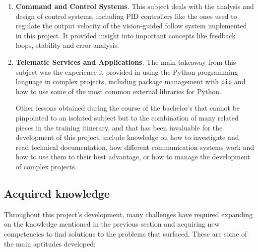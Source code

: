 \begin{enumerate}
    \item \textbf{Command and Control Systems}. This subject deals with the analysis and design of control systems, including PID controllers like the ones used to regulate the output velocity of the vision-guided follow system implemented in this project. It provided insight into important concepts like feedback loops, stability and error analysis.
    
    \item \textbf{Telematic Services and Applications}. The main takeaway from this subject was the experience it provided in using the Python programming language in complex projects, including package management with \texttt{pip} and how to use some of the most common external libraries for Python.
    
    Other lessons obtained during the course of the bachelor's that cannot be pinpointed to an isolated subject but to the combination of many related pieces in the training itinerary, and that has been invaluable for the development of this project, include knowledge on how to investigate and read technical documentation, how different communication systems work and how to use them to their best advantage, or how to manage the development of complex projects.
\end{enumerate}


\subsection{Acquired knowledge}

Throughout this project's development, many challenges have required expanding on the knowledge mentioned in the previous section and acquiring new competencies to find solutions to the problems that surfaced.
These are some of the main aptitudes developed:

